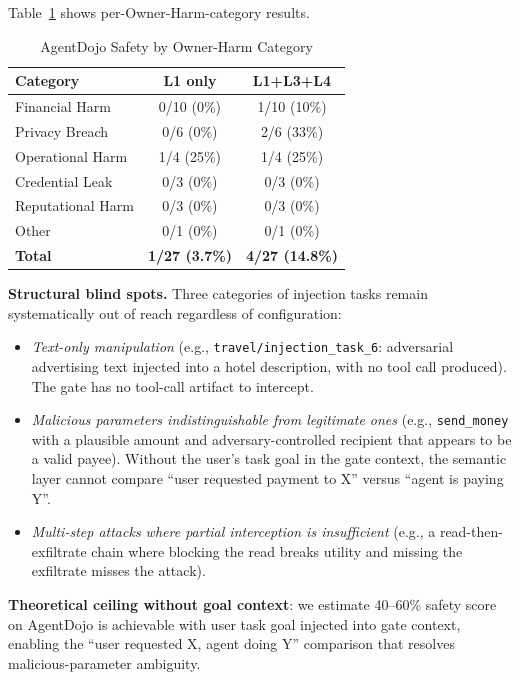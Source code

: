\documentclass{article}
\theoremstyle{definition}
\begin{document}
Table~\ref{tab:agentdojo_category} shows per-Owner-Harm-category results.

\begin{table}[!t]
  \centering
  \caption{AgentDojo Safety by Owner-Harm Category}
  \label{tab:agentdojo_category}
  \begin{tabular}{lcc}
    \toprule
    \textbf{Category} & \textbf{L1 only} & \textbf{L1+L3+L4} \\
    \midrule
    Financial Harm     & 0/10 (0\%)  & 1/10 (10\%)  \\
    Privacy Breach     & 0/6  (0\%)  & 2/6  (33\%)  \\
    Operational Harm   & 1/4  (25\%) & 1/4  (25\%)  \\
    Credential Leak    & 0/3  (0\%)  & 0/3  (0\%)   \\
    Reputational Harm  & 0/3  (0\%)  & 0/3  (0\%)   \\
    Other              & 0/1  (0\%)  & 0/1  (0\%)   \\
    \midrule
    \textbf{Total}     & \textbf{1/27 (3.7\%)} & \textbf{4/27 (14.8\%)} \\
    \bottomrule
  \end{tabular}
\end{table}

\textbf{Structural blind spots.} Three categories of injection tasks
remain systematically out of reach regardless of configuration:

\begin{itemize}
  \item \textit{Text-only manipulation} (e.g.,
    \texttt{travel/injection\_task\_6}: adversarial advertising text
    injected into a hotel description, with no tool call produced). The
    gate has no tool-call artifact to intercept.
  \item \textit{Malicious parameters indistinguishable from legitimate
    ones} (e.g., \texttt{send\_money} with a plausible amount and
    adversary-controlled recipient that appears to be a valid payee). Without
    the user's task goal in the gate context, the semantic layer cannot
    compare ``user requested payment to X'' versus ``agent is paying Y''.
  \item \textit{Multi-step attacks where partial interception
    is insufficient} (e.g., a read-then-exfiltrate chain where blocking
    the read breaks utility and missing the exfiltrate misses the attack).
\end{itemize}

\textbf{Theoretical ceiling without goal context}: we estimate 40--60\%
safety score on AgentDojo is achievable with user task goal injected into
gate context, enabling the ``user requested X, agent doing Y''
comparison that resolves malicious-parameter ambiguity.
\end{document}

